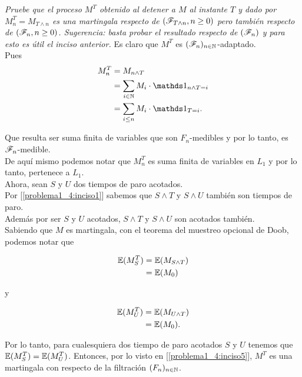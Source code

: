 \emph{
	Pruebe que el proceso $M^T$ obtenido al detener a $M$ al instante $T$ y dado por $M^T_n=M_{T\wedge n}$ es una 
	martingala respecto de $\left( \mathscr{F}_{T\wedge n},n\geq 0\right) $ pero tambi\'en respecto de $\left( \mathscr{F}_{n},n\geq 0\right) $. 
	Sugerencia: basta probar el resultado respecto de $\left( \mathscr{F}_n\right) $ y para esto es \'util el inciso anterior.
}
\afterstatement
	Es claro que $M^T$ es $(\mathscr{F}_n)_{n \in \mathbb{N}}$-adaptado.\\

	Pues
	\begin{align}
		M_n^T 		&= 		M_{n \wedge T} 									\\
					&= 		\sum_{i \in \N} M_i \cdot \indic_{n \wedge T = i}		\\
					&=      \sum_{i \leq n} M_i \cdot \indic_{T = i}.
	\end{align}		

	Que resulta ser suma finita de variables que son $F_n$-medibles y por lo tanto,
	es $\mathscr{F}_n$-medible.	\\
	
	De aquí mismo podemos notar que $M_n^T$ es suma finita de variables en $L_1$ y por
	lo tanto, pertenece a $L_1$.\\
	
	Ahora, sean $S$ y $U$ dos tiempos de paro acotados.\\
	
	Por [\ref{problema1_4:inciso1}] sabemos que $S \wedge T$ y $S \wedge U$ también son tiempos de paro.\\
	
	Además por ser $S$ y $U$ acotados, $S \wedge T$ y $S \wedge U$ son acotados también.\\

	Sabiendo que $M$ es martingala, con el teorema del muestreo opcional de Doob, podemos notar que
	
	\begin{align}
		\mathbb{E}(M_S^T) 	&=	\mathbb{E}(M_{S \wedge T}) \\
					&= \mathbb{E}(M_0)
	\end{align}
	
	y
	
	\begin{align}
		\mathbb{E}(M_U^T) 	&=	\mathbb{E}(M_{U \wedge T}) \\
					&= \mathbb{E}(M_0).
	\end{align}
	
	Por lo tanto, para cualesquiera dos tiempo de paro acotados $S$ y $U$ tenemos que $\mathbb{E}(M_S^T) = \mathbb{E}(M_U^T)$.
	Entonces, por lo visto en [\ref{problema1_4:inciso5}], $M^T$ es una martingala con respecto de la filtración
	$(F_n)_{n \in \mathbb{N}}$.\\
	
